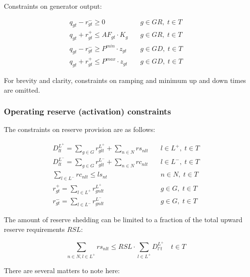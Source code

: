 \documentclass[number,times]{elsarticle}
\begin{document}
Constraints on generator output:

\begin{align}
    q_{gt} - r^{-}_{gt} \geq 0                    & \quad g \in GR, \; t \in T \\
    q_{gt} + r^{+}_{gt} \leq AF_{gt} \cdot K_g    & \quad g \in GR, \; t \in T \\
    q_{gt} - r^{-}_{gt} \geq P^{min} \cdot z_{gt} & \quad g \in GD, \; t \in T \\
    q_{gt} + r^{+}_{gt} \leq P^{max} \cdot z_{gt} & \quad g \in GD, \; t \in T
\end{align}

For brevity and clarity, constraints on ramping and minimum up and down times are omitted.

\subsubsection{Operating reserve (activation) constraints}

The constraints on reserve provision are as follows:

\begin{align}
    D^{L^+}_{lt} = \sum_{g \in G} r^{L^+}_{glt} + \sum_{n \in N} rs_{nlt} & \quad l \in L^+, \; t \in T \\
    D^{L^-}_{lt} = \sum_{g \in G} r^{L^-}_{glt} + \sum_{n \in N} rc_{nlt} & \quad l \in L^-, \; t \in T \\
    \sum_{l \in L^-} rc_{nlt} \leq ls_{nt}                                & \quad n \in N, \; t \in T   \\
    r^{+}_{gt} = \sum_{l \in L^+} r^{L^+}_{gnlt}                          & \quad g \in G, \; t \in T   \\
    r^{-}_{gt} = \sum_{l \in L^-} r^{L^-}_{gnlt}                          & \quad g \in G, \; t \in T
\end{align}

The amount of reserve shedding can be limited to a fraction of the total upward reserve requirements $RSL$:

\begin{equation}
    \sum_{n \in N, l \in L^+} rs_{nlt} \leq RSL \cdot \sum_{l \in L^+} D^{L^+}_{l't} \quad t \in T
\end{equation}

There are several matters to note here:
\end{document}
